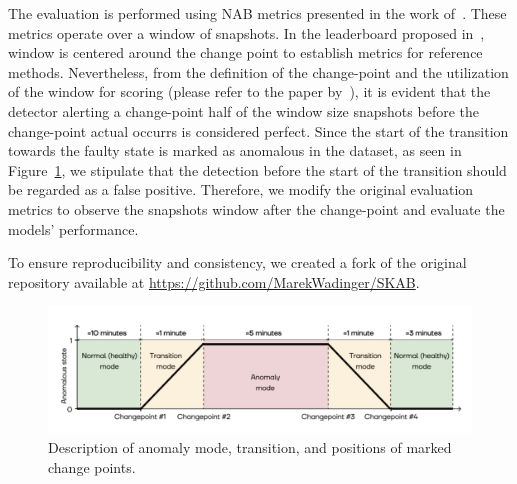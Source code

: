 The evaluation is performed using NAB metrics presented in the work of~\citet{Ahmad2017}. These metrics operate over a window of snapshots. In the leaderboard proposed in~\citet{Katser2020}, window is centered around the change point to establish metrics for reference methods. Nevertheless, from the definition of the change-point and the utilization of the window for scoring (please refer to the paper by~\citet{Lavin2015}), it is evident that the detector alerting a change-point half of the window size snapshots before the change-point actual occurrs is considered perfect. Since the start of the transition towards the faulty state is marked as anomalous in the dataset, as seen in Figure~\ref{fig:scab_interpretation}, we stipulate that the detection before the start of the transition should be regarded as a false positive. Therefore, we modify the original evaluation metrics to observe the snapshots window after the change-point and evaluate the models' performance.

To ensure reproducibility and consistency, we created a fork of the original repository available at \url{https://github.com/MarekWadinger/SKAB}.

\begin{figure}[H]
    \centering
    \includegraphics[width=\linewidth]{figures/scab-interpretation.png}
    \caption{Description of anomaly mode, transition, and positions of marked change points.}\label{fig:scab_interpretation}
\end{figure}


